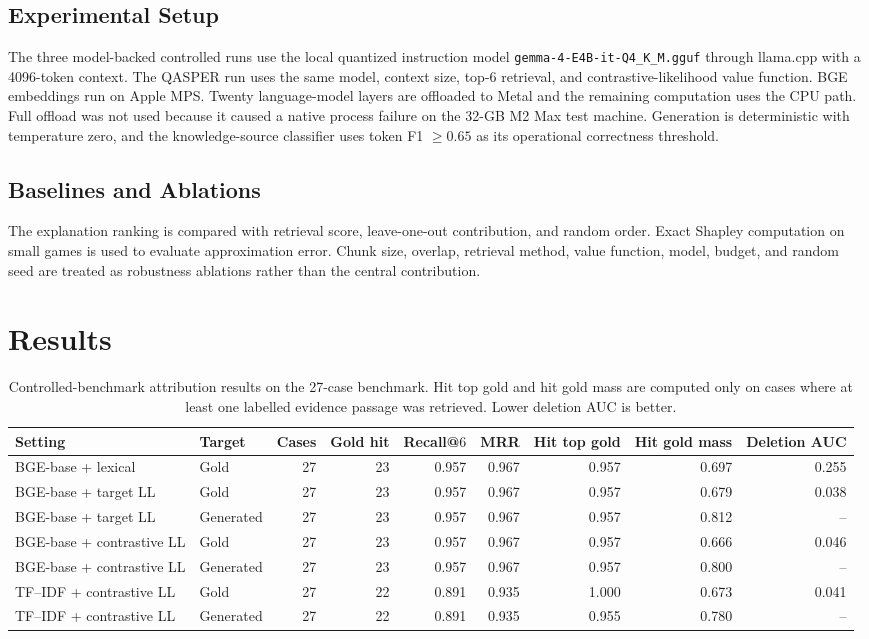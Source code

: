 \documentclass[10pt]{article}
\begin{document}
\subsection{Experimental Setup}
The three model-backed controlled runs use the local quantized instruction model
\texttt{gemma-4-E4B-it-Q4\_K\_M.gguf} through llama.cpp with a 4096-token
context. The QASPER run uses the same model, context size, top-$6$ retrieval,
and contrastive-likelihood value function. BGE embeddings run on Apple MPS.
Twenty language-model layers are offloaded to Metal and the remaining
computation uses the CPU path. Full offload was not used because it caused a
native process failure on the 32-GB M2 Max test machine. Generation is
deterministic with temperature zero, and the knowledge-source classifier uses
token F1 $\geq 0.65$ as its operational correctness threshold.

\subsection{Baselines and Ablations}
The explanation ranking is compared with retrieval score, leave-one-out
contribution, and random order. Exact Shapley computation on small games is used
to evaluate approximation error. Chunk size, overlap, retrieval method, value
function, model, budget, and random seed are treated as robustness ablations
rather than the central contribution.

\section{Results}
\begin{table}[ht]
\centering
\small
\caption{Controlled-benchmark attribution results on the 27-case benchmark.
Hit top gold and hit gold mass are computed only on cases where at least one
labelled evidence passage was retrieved. Lower deletion AUC is better.}
\begin{tabular}{llrrrrrrr}
\toprule
Setting & Target & Cases & Gold hit & Recall@$6$ & MRR & Hit top gold &
Hit gold mass & Deletion AUC \\
\midrule
BGE-base + lexical & Gold & 27 & 23 & 0.957 & 0.967 & 0.957 & 0.697 & 0.255 \\
BGE-base + target LL & Gold & 27 & 23 & 0.957 & 0.967 & 0.957 & 0.679 & 0.038 \\
BGE-base + target LL & Generated & 27 & 23 & 0.957 & 0.967 & 0.957 & 0.812 & -- \\
BGE-base + contrastive LL & Gold & 27 & 23 & 0.957 & 0.967 & 0.957 & 0.666 & 0.046 \\
BGE-base + contrastive LL & Generated & 27 & 23 & 0.957 & 0.967 & 0.957 & 0.800 & -- \\
TF--IDF + contrastive LL & Gold & 27 & 22 & 0.891 & 0.935 & 1.000 & 0.673 & 0.041 \\
TF--IDF + contrastive LL & Generated & 27 & 22 & 0.891 & 0.935 & 0.955 & 0.780 & -- \\
\bottomrule
\end{tabular}
\end{table}
\end{document}
